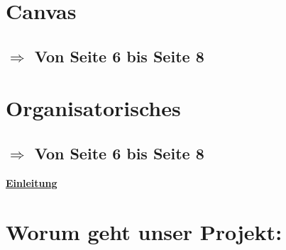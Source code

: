 \documentclass[a4paper, 10pt, oneside]{article} %
\begin{document}
\section{Canvas}
\subsection*{$\Rightarrow$ Von Seite 6 bis Seite 8}
\vspace*{4mm}

\section{Organisatorisches}
\subsection*{$\Rightarrow$ Von Seite 6 bis Seite 8}
\vspace*{4mm}




\newpage


\huge{\underline{\textbf{Einleitung}}}
\newline

\section*{Worum geht unser Projekt:}
\end{document}
